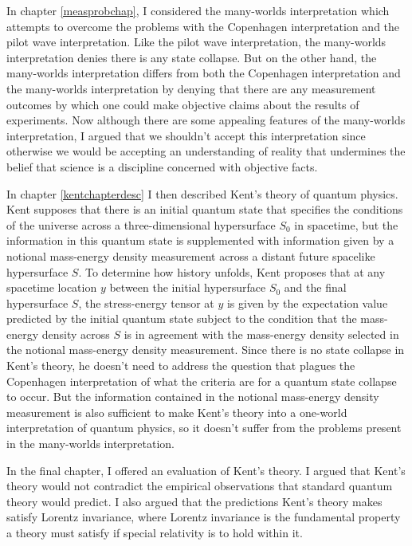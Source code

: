 In chapter \ref{measprobchap}, I considered the many-worlds interpretation which attempts to overcome the problems with the Copenhagen interpretation and the pilot wave interpretation. Like the pilot wave interpretation, the many-worlds interpretation denies there is any state collapse. But on the other hand, the many-worlds interpretation differs from both the Copenhagen interpretation and the many-worlds interpretation by denying that there are any measurement outcomes by which one could make objective claims about the results of experiments. Now although there are some appealing features of the many-worlds interpretation, I argued that we shouldn't accept this interpretation since otherwise we would be accepting an understanding of reality that undermines the belief that science is a discipline concerned with objective facts. 

In chapter \ref{kentchapterdesc} I then described Kent's theory of quantum physics. Kent supposes that there is an initial quantum state that specifies the conditions of the universe across a three-dimensional hypersurface $S_0$ in spacetime, but the information in this quantum state is supplemented with information given by a notional mass-energy density measurement across a distant future spacelike hypersurface $S$. To determine how history unfolds, Kent proposes that at any spacetime location $y$ between the initial hypersurface $S_0$ and the final hypersurface $S$, the stress-energy tensor at $y$ is given by the expectation value predicted by the initial quantum state subject to the condition that the mass-energy density across $S$ is in agreement with the mass-energy density selected in the notional mass-energy density measurement. Since there is no state collapse in Kent's theory, he doesn't need to address the question that plagues the Copenhagen interpretation of what the criteria are for a quantum state collapse to occur. But the information contained in the notional mass-energy density measurement is also sufficient to make Kent's theory into a one-world interpretation of quantum physics, so it doesn't suffer from the problems present in the many-worlds interpretation. 

In the final chapter, I offered an evaluation of Kent's theory. I argued that Kent's theory would not contradict the empirical observations that standard quantum theory would predict. I also argued that the predictions Kent's theory makes satisfy Lorentz invariance, where Lorentz invariance is the fundamental property a theory must satisfy if special relativity is to hold within it. 

